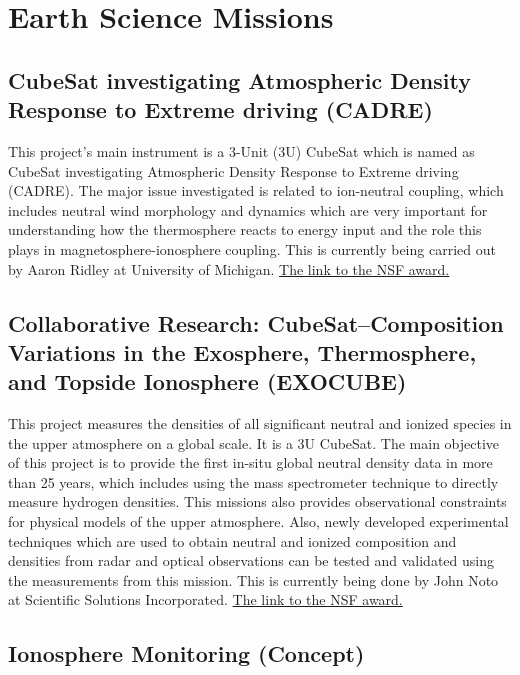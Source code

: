 \section{Earth Science Missions}

\subsection{CubeSat investigating Atmospheric Density Response to Extreme driving (CADRE)}
\label{CADRE}
This project's  main instrument is a 3-Unit (3U) CubeSat which is named as CubeSat investigating Atmospheric Density Response to Extreme driving (CADRE). The major issue investigated is related to ion-neutral coupling, which includes neutral wind morphology and dynamics which are very important for understanding how the thermosphere reacts to energy input and the role this plays in magnetosphere-ionosphere coupling. This is currently being carried out by Aaron Ridley at University of Michigan. \href{http://nsf.gov/awardsearch/showAward?AWD_ID=1042815&HistoricalAwards=false}{The link to the NSF award.}

\subsection{Collaborative Research: CubeSat--Composition Variations in the Exosphere, Thermosphere, and Topside Ionosphere (EXOCUBE)}
\label{exocube}
This project measures the densities of all significant neutral and ionized species in the upper atmosphere on a global scale. It is a 3U CubeSat. The main objective of this project is to provide the first in-situ global neutral density data in more than 25 years, which includes using the mass spectrometer technique to directly measure hydrogen densities. This missions also provides observational constraints for physical models of the upper atmosphere. Also, newly developed experimental techniques which are used to obtain neutral and ionized composition and densities from radar and optical observations can be tested and validated using the measurements from this mission. This is currently being done by John Noto at Scientific Solutions Incorporated. \href{http://nsf.gov/awardsearch/showAward?AWD_ID=1042837&HistoricalAwards=false}{The link to the NSF award.}



\subsection{Ionosphere Monitoring (Concept)}

